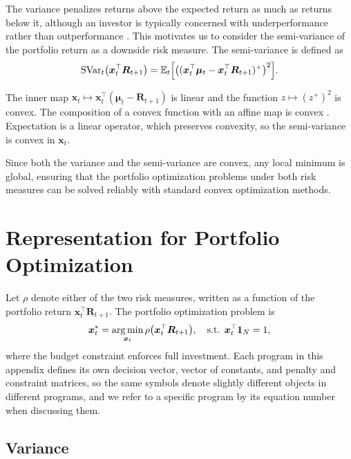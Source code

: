 The variance penalizes returns above the expected return as much as returns below it, although an investor is typically
concerned with underperformance rather than outperformance \cite{Markowitz1993}. This motivates us to consider the semi-variance of the portfolio return
as a downside risk measure. The semi-variance is defined as
\begin{equation} \label{eq:svar_def}
    \text{SVar}_t\bigl( \bm{x}_t^\top \bm{R}_{t+1} \bigr)
    = \mathbb{E}_t\Bigl[ \bigl( (\bm{x}_t^\top \bm{\mu}_t - \bm{x}_t^\top \bm{R}_{t+1})^+ \bigr)^2 \Bigr].
\end{equation}

The inner map $\bm{x}_t \mapsto \bm{x}_t^\top (\bm{\mu}_t - \bm{R}_{t+1})$ is linear and the function
$z \mapsto (z^+)^2$ is convex. The composition of a convex function with
an affine map is convex \cite[Section~3.2.2]{boyd2004convex}. Expectation is a
linear operator, which preserves convexity, so the semi-variance is convex in $\bm{x}_t$.

Since both the variance and the semi-variance are convex, any local minimum is global, ensuring that the portfolio
optimization problems under both risk measures can be solved reliably with standard convex optimization methods.



\section{Representation for Portfolio Optimization} \label{app:mv_representation}

Let $\rho$ denote either of the two risk measures, written as a function of the portfolio return
$\bm{x}_t^\top \bm{R}_{t+1}$. The portfolio optimization problem is
\begin{equation} \label{eq:mv_risk_min}
    \bm{x}_t^* = \operatorname*{arg\,min}_{\bm{x}_t} \rho\bigl( \bm{x}_t^\top \bm{R}_{t+1} \bigr), \quad \text{s.t. } \bm{x}_t^\top \bm{1}_N = 1,
\end{equation}
where the budget constraint enforces full investment. Each program in this appendix defines its own decision vector,
vector of constants, and penalty and constraint matrices, so the same symbols denote slightly different objects in
different programs, and we refer to a specific program by its equation number when discussing them.

\subsection{Variance} \label{app:mv_var_qp} 

